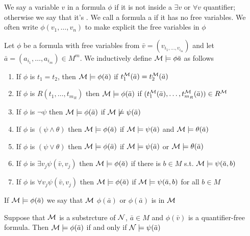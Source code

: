 \documentclass[11pt]{article}
\begin{document}
We say a variable \(v\)  in a formula \(\phi\) if it is not
inside a \(\exists v\) or \(\forall v\) quantifier; otherwise we say that it's
. We call a formula a  if it has no free variables. We
often write \(\phi(v_1,\dots,v_n)\) to make explicit the free variables in \(\phi\)

\begin{definition}[]
Let \(\phi\) be a formula with free variables from
\(\bar{v}=(v_{i_1,\dots,v_{i_m}})\) and let \(\bar{a}=(a_{i_1},\dots,a_{i_m})\in
   M^m\). We inductively define \(\mathcal{M}\models\phi\bar{a}\) as follows
\begin{enumerate}
\item If \(\phi\) is \(t_1=t_2\), then \(\mathcal{M}\models\phi(\bar{a})\) if
\(t_1^{\mathcal{M}}(\bar{a})=t_2^{\mathcal{M}}(\bar{a})\)
\item If \(\phi\) is \(R(t_1,\dots,t_{m_R})\) then \(\mathcal{M}\models\phi(\bar{a})\) if
\((t_1^{\mathcal{M}}(\bar{a}),\dots,t_{m_R}^{\mathcal{M}}(\bar{a}))\in R^{\mathcal{M}}\)
\item If \(\phi\) is \(\neg\psi\) then \(\mathcal{M}\models\phi(\bar{a})\) if
\(\mathcal{M}\not\models\psi(\bar{a})\)
\item If \(\phi\) is \((\psi\wedge\theta)\) then \(\mathcal{M}\models\phi(\bar{a})\) if
\(\mathcal{M}\models\psi(\bar{a})\) and
\(\mathcal{M}\models\theta(\bar{a})\)
\item If \(\phi\) is \((\psi\vee\theta)\) then \(\mathcal{M}\models\phi(\bar{a})\) if
\(\mathcal{M}\models\psi(\bar{a})\) or
\(\mathcal{M}\models\theta(\bar{a})\)
\item If \(\phi\) is \(\exists v_j\psi(\bar{v},v_j)\) then \(\mathcal{M}\models\phi(\bar{a})\)
if there is \(b\in M\) s.t. \(\mathcal{M}\models\psi(\bar{a},b)\)
\item If \(\phi\) is \(\forall v_j\psi(\bar{v},v_j)\) then \(\mathcal{M}\models\phi(\bar{a})\)
if \(\mathcal{M}\models\psi(\bar{a},b)\) for all \(b\in M\)
\end{enumerate}
\end{definition}


If \(\mathcal{M}\models\phi(\bar{a})\) we say that \(\mathcal{M}\) 
\(\phi(\bar{a})\) or \(\phi(\bar{a})\) is  in \(\mathcal{M}\)

\begin{proposition}[]
Suppose that \(\mathcal{M}\) is a substrcture of \(\mathcal{N}\), \(\bar{a}\in M\) and
\(\phi(\bar{v})\) is a quantifier-free formula. Then
\(\mathcal{M}\models\phi(\bar{a})\) if and only if \(\mathcal{N}\models\psi(\bar{a})\)
\end{proposition}
\end{document}
